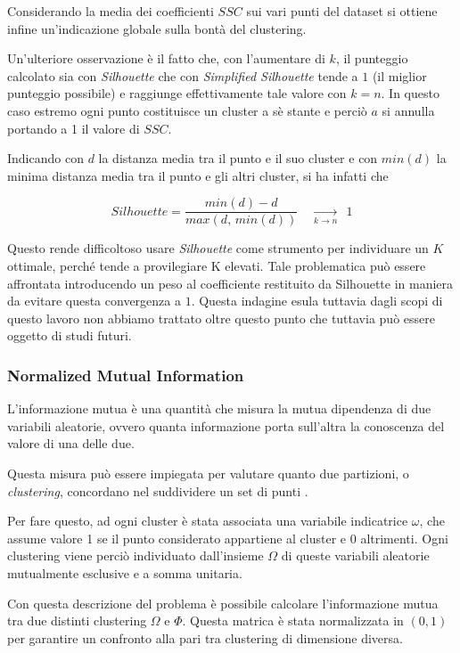 \documentclass[
	11pt, %
	a4paper, %
	oneside, %
	headinclude,footinclude, %
	BCOR5mm, %
]{scrartcl}
\begin{document}
			Considerando la media dei coefficienti $SSC$ sui vari punti del dataset si ottiene infine un'indicazione globale sulla bontà del clustering.

			\smallbreak
			Un'ulteriore osservazione è il fatto che, con l'aumentare di $k$, il punteggio calcolato sia con \emph{Silhouette} che con \emph{Simplified Silhouette} tende a $1$ (il miglior punteggio possibile) e raggiunge effettivamente tale valore con $k = n$.
			In questo caso estremo ogni punto costituisce un cluster a sè stante e perciò $a$ si annulla portando a 1 il valore di $SSC$.
			
			Indicando con $d$ la distanza media tra il punto e il suo cluster e con $min(d)$ la minima distanza media tra il punto e gli altri cluster, si ha infatti che

			\begin{equation} \label{eq:silhouetteToOne}
				Silhouette = \frac{min(d) - d}{ max(d, \,min(d)) } \quad \xrightarrow [k \to n] \quad ~~ 1 \end{equation}

			Questo rende difficoltoso usare \emph{Silhouette} come strumento per individuare un $K$ ottimale, perché tende a provilegiare K elevati.
			Tale problematica può essere affrontata introducendo un peso al coefficiente restituito da Silhouette in maniera da evitare questa convergenza a $1$.
			Questa indagine esula tuttavia dagli scopi di questo lavoro non abbiamo trattato oltre questo punto che tuttavia può essere oggetto di studi futuri.

		\subsubsection{Normalized Mutual Information} \label{sec:NMI}
			L'informazione mutua è una quantità che misura la mutua dipendenza di due variabili aleatorie, ovvero quanta informazione porta sull'altra la conoscenza del valore di una delle due.

			Questa misura può essere impiegata per valutare quanto due partizioni, o \emph{clustering}, concordano nel suddividere un set di punti \cite{Manning}.

			Per fare questo, ad ogni cluster è stata associata una variabile indicatrice $\omega$, che assume valore 1 se il punto considerato appartiene al cluster e 0 altrimenti.
			Ogni clustering viene perciò individuato dall'insieme $\Omega$ di queste variabili aleatorie mutualmente esclusive e a somma unitaria.

			Con questa descrizione del problema è possibile calcolare l'informazione mutua tra due distinti clustering $\Omega$ e $\Phi$.
			Questa matrica è stata normalizzata in $(0, 1)$ per garantire un confronto alla pari tra clustering di dimensione diversa.
\end{document}
